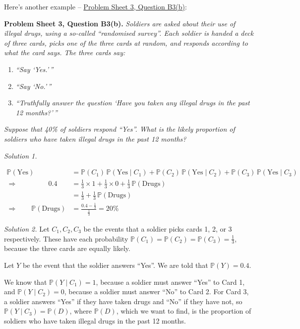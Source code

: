 \documentclass[
  a4paper,
]{book}
\providecommand{\tightlist}{%
  \setlength{\itemsep}{0pt}\setlength{\parskip}{0pt}}
\theoremstyle{definition}
\theoremstyle{definition}
\theoremstyle{definition}
\theoremstyle{definition}
\theoremstyle{remark}
\begin{document}
Here's another example -- \protect\hyperlink{P3-long}{Problem Sheet 3, Question B3(b)}:

\textbf{Problem Sheet 3, Question B3(b).} \emph{Soldiers are asked about their use of illegal drugs, using a so-called ``randomised survey''. Each soldier is handed a deck of three cards, picks one of the three cards at random, and responds according to what the card says. The three cards say:}

\begin{enumerate}
\def\labelenumi{\arabic{enumi}.}
\tightlist
\item
  \emph{``Say `Yes.'\,''}
\item
  \emph{``Say `No.'\,''}
\item
  \emph{``Truthfully answer the question `Have you taken any illegal drugs in the past 12 months?'\,''}
\end{enumerate}

\emph{Suppose that 40\% of soldiers respond ``Yes''. What is the likely proportion of soldiers who have taken illegal drugs in the past 12 months?}

\emph{Solution 1.}

\begin{align*} \mathbb P(\text{Yes}) &= \mathbb P(C_1)\,\mathbb P(\text{Yes} \mid C_1) + \mathbb P(C_2)\,\mathbb P(\text{Yes} \mid C_2) + 
\mathbb P(C_3)\,\mathbb P(\text{Yes} \mid C_3) \\
\Rightarrow \qquad\qquad\  \  0.4 &= \tfrac13 \times 1 + \tfrac13 \times 0 + \tfrac13 \, \mathbb P(\text{Drugs}) \\
&=\tfrac13 + \tfrac13 \,\mathbb P(\text{Drugs})  \\
\Rightarrow \qquad \mathbb P(\text{Drugs}) &= \frac{0.4 - \frac13}{\frac13} = 20\%
\end{align*}

\emph{Solution 2.}
Let \(C_1, C_2, C_3\) be the events that a soldier picks cards 1, 2, or 3 respectively. These have each probability \(\mathbb P(C_1) = \mathbb P(C_2) = \mathbb P(C_3) = \frac13\), because the three cards are equally likely.

Let \(Y\) be the event that the soldier answers ``Yes''. We are told that \(\mathbb P(Y) = 0.4\).

We know that \(\mathbb P(Y \mid C_1) = 1\), because a soldier must answer ``Yes'' to Card 1, and \(\mathbb P(Y \mid C_2) = 0\), because a soldier must answer ``No'' to Card 2. For Card 3, a soldier answers ``Yes'' if they have taken drugs and ``No'' if they have not, so \(\mathbb P(Y \mid C_3) = \mathbb P(D)\), where \(\mathbb P(D)\), which we want to find, is the proportion of soldiers who have taken illegal drugs in the past 12 months.
\end{document}
